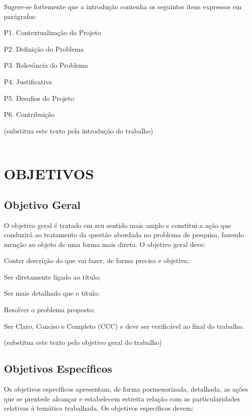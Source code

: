 Sugere-se fortemente que a  introdução contenha os seguintes itens expressos em parágrafos:

P1. Contextualização do Projeto

P2. Definição do Problema

P3. Relevância do Problema

P4. Justificativa

P5. Desafios do Projeto

P6. Contribuição

(substitua este texto pela introdução do trabalho) \\ \\

{\let\clearpage\relax \chapter{OBJETIVOS}}
\label{chap:objetivos}

\section{Objetivo Geral}
\label{sec:objgeral}
O objetivo geral é tratado em seu sentido mais amplo e constitui a ação que conduzirá ao tratamento da questão abordada no problema de pesquisa, fazendo menção ao objeto de uma forma mais direta. O objetivo geral deve:

Conter descrição do que vai fazer, de forma precisa e objetiva;

Ser diretamente ligado ao título;

Ser mais detalhado que o título;

Resolver o problema proposto;

Ser Claro, Conciso e Completo (CCC) e deve ser verificável ao final do trabalho.

(substitua este texto pelo objetivo geral do trabalho)

\section{Objetivos Específicos}
\label{sec:objespc}
Os objetivos específicos apresentam, de forma pormenorizada, detalhada, as ações que se prentede alcançar e estabelecem estreita relação com as particularidades relativas à temática trabalhada. Os objetivos específicos devem:

